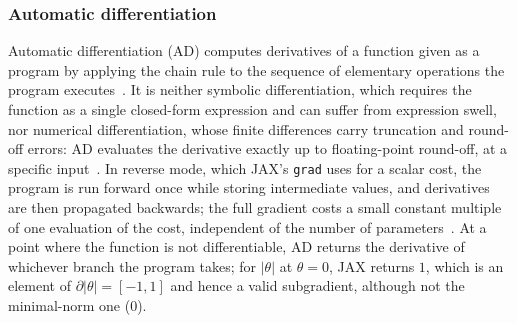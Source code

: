 \subsubsection{Automatic differentiation}
Automatic differentiation (AD) computes derivatives of a function given as a
program by applying the chain rule to the sequence of elementary operations the
program executes~\cite{baydin_2018}. It is
neither symbolic differentiation, which requires the function as a single closed-form
expression and can suffer from expression swell, nor numerical differentiation, whose
finite differences carry truncation and round-off errors: AD evaluates the
derivative exactly up to floating-point round-off, at a specific input~\cite{hjorth-jensen_2026}. In
reverse mode, which JAX's \texttt{grad} uses for a scalar cost, the program is
run forward once while storing intermediate values, and derivatives are then
propagated backwards; the full gradient costs a small constant multiple of one
evaluation of the cost, independent of the number of
parameters~\cite{baydin_2018}. At a point where
the function is not differentiable, AD returns the derivative of whichever
branch the program takes; for $|\theta|$ at $\theta=0$, JAX returns $1$, which
is an element of $\partial|\theta| = [-1,1]$ and hence a valid subgradient,
although not the minimal-norm one ($0$).
